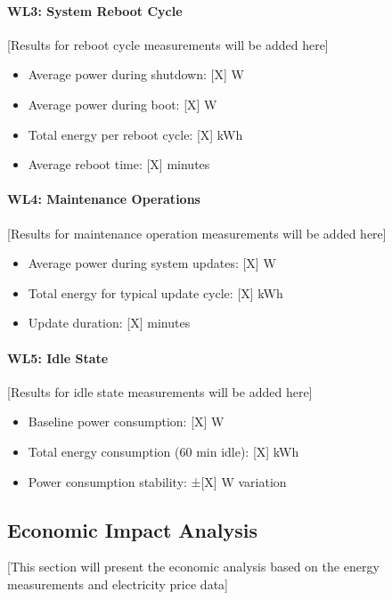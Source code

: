 \paragraph{WL3: System Reboot Cycle}
[Results for reboot cycle measurements will be added here]
\begin{itemize}
    \item Average power during shutdown: [X] W
    \item Average power during boot: [X] W
    \item Total energy per reboot cycle: [X] kWh
    \item Average reboot time: [X] minutes
\end{itemize}

\paragraph{WL4: Maintenance Operations}
[Results for maintenance operation measurements will be added here]
\begin{itemize}
    \item Average power during system updates: [X] W
    \item Total energy for typical update cycle: [X] kWh
    \item Update duration: [X] minutes
\end{itemize}

\paragraph{WL5: Idle State}
[Results for idle state measurements will be added here]
\begin{itemize}
    \item Baseline power consumption: [X] W
    \item Total energy consumption (60 min idle): [X] kWh
    \item Power consumption stability: ±[X] W variation
\end{itemize}

\subsection{Economic Impact Analysis}
\label{results:economic-impact-analysis}
[This section will present the economic analysis based on the energy measurements and 
electricity price data]

